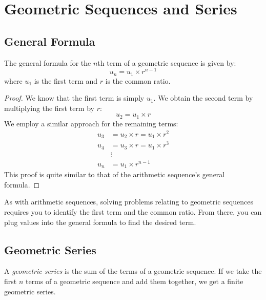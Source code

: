 \chapter{Geometric Sequences and Series}

\section{General Formula}

\begin{proposition}
	  The general formula for the $n$th term of a geometric sequence is given by:
  \begin{equation}
	u_n = u_1 \times r^{n-1}
  \end{equation}
  where $u_1$ is the first term and $r$ is the common ratio.
\end{proposition}
\begin{proof}
	We know that the first term is simply $u_1$. We obtain the second term by multiplying the first term by $r$:
	\begin{equation}
		u_2 = u_1 \times r
	\end{equation}
	We employ a similar approach for the remaining terms:
	\begin{align}
		u_3 &= u_2 \times r = u_1 \times r^2 \\
		u_4 &= u_3 \times r = u_1 \times r^3 \\
		&\vdots \\
		u_n &= u_1 \times r^{n-1}
	\end{align}
	This proof is quite similar to that of the arithmetic sequence's general formula.
\end{proof}

As with arithmetic sequences, solving problems relating to geometric sequences
requires you to identify the first term and the common ratio. From there, you can 
plug values into the general formula to find the desired term.

\section{Geometric Series}

\begin{definition}
	A \textit{geometric series} is the sum of the terms of a geometric sequence. If we take the first $n$ terms of a geometric sequence
	and add them together, we get a finite geometric series. 
\end{definition}

